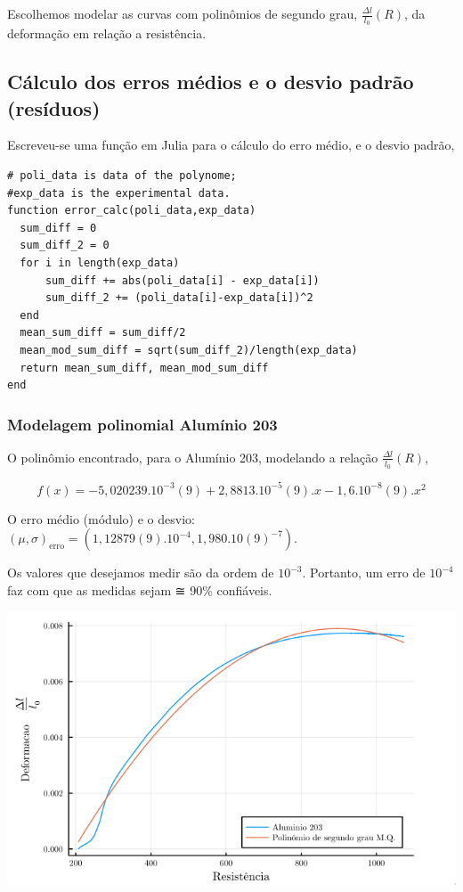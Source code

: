 \documentclass[11pt]{article}
\begin{document}
Escolhemos modelar as curvas com polinômios de segundo grau, \(\frac{\Delta l}{l_0}(R)\), da deformação em relação a resistência.

\subsection{Cálculo dos erros médios e o desvio padrão (resíduos)}
\label{sec:org04bf72d}

Escreveu-se uma função em Julia para o cálculo do erro médio, e o desvio padrão,

\begin{verbatim}
# poli_data is data of the polynome;
#exp_data is the experimental data.
function error_calc(poli_data,exp_data)
  sum_diff = 0
  sum_diff_2 = 0
  for i in length(exp_data)
      sum_diff += abs(poli_data[i] - exp_data[i])
      sum_diff_2 += (poli_data[i]-exp_data[i])^2
  end
  mean_sum_diff = sum_diff/2
  mean_mod_sum_diff = sqrt(sum_diff_2)/length(exp_data)
  return mean_sum_diff, mean_mod_sum_diff
end
\end{verbatim}

\subsubsection{Modelagem polinomial Alumínio 203}
\label{sec:org519b7ec}
O polinômio encontrado, para o Alumínio 203, modelando a relação \(\frac{\Delta l}{l_0}(R)\),

\begin{equation}
f(x)=-5,020239.10^{-3}(9) + 2,8813.10^{-5}(9).x - 1,6.10^{-8}(9).x^2
\end{equation}

O erro médio (módulo) e o desvio: \((\mu, \sigma)_{\textrm{erro}} = (1,12879(9).10^{-4}, 1,980.10(9)^{-7})\).

Os valores que desejamos medir são da ordem de \(10^{-3}\). Portanto, um erro de \(10^{-4}\) faz com que as medidas sejam ≅ 90\% confiáveis.

\href{img/polinomio-aluminio203.png}{\includegraphics[width=.9\linewidth]{./img/polinomio-aluminio203.png}}
\end{document}
